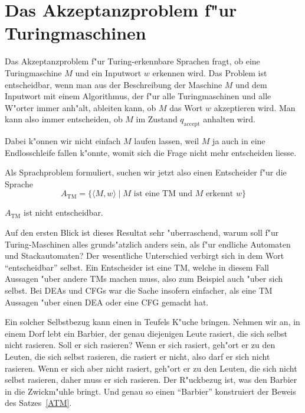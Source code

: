 \section{Das Akzeptanzproblem f"ur Turingmaschinen}
Das Akzeptanzproblem f"ur Turing-erkennbare Sprachen fragt, ob 
eine Turingmaschine $M$ und ein Inputwort $w$ erkennen wird.
Das Problem ist entscheidbar, wenn man aus der Beschreibung
der Maschine $M$ und dem Inputwort mit einem Algorithmus, der
f"ur alle Turingmaschinen und alle W"orter immer anh"alt, ableiten
kann, ob $M$ das Wort $w$ akzeptieren wird. Man kann also immer
entscheiden, ob $M$ im Zustand $q_{\text{accept}}$ anhalten wird.

Dabei k"onnen wir nicht einfach $M$ laufen lassen, weil $M$
ja auch in eine Endlosschleife fallen k"onnte, womit sich die
Frage nicht mehr entscheiden liesse.

Als Sprachproblem formuliert, suchen wir jetzt also einen
Entscheider f"ur die Sprache
\[
A_{\text{TM}}=\{
\langle M,w\rangle\;|\; \text{$M$ ist eine TM und $M$ erkennt $w$}
\}
\]

\begin{satz}
\label{ATM}
$A_{\text{TM}}$ ist nicht entscheidbar.
\end{satz}

Auf den ersten Blick ist dieses Resultat sehr "uberraschend, warum
soll f"ur Turing-Maschinen alles grunds"atzlich anders sein, als
f"ur endliche Automaten und Stackautomaten? Der wesentliche Unterschied
verbirgt sich in dem Wort ``entscheidbar'' selbst. Ein Entscheider ist eine
TM, welche in diesem Fall Aussagen "uber andere TMs machen muss, also
zum Beispiel auch "uber sich selbst. Bei DEAs und CFGs war die Sache
insofern einfacher, als eine TM Aussagen "uber einen DEA oder eine
CFG gemacht hat.

Ein solcher Selbstbezug kann einen in Teufels K"uche bringen. 
Nehmen wir an, in einem Dorf lebt ein Barbier, der genau diejenigen
Leute rasiert, die sich selbst nicht rasieren. Soll er sich rasieren?
Wenn er sich rasiert, geh"ort er zu den Leuten, die sich selbst rasieren,
die rasiert er nicht, also darf er sich nicht rasieren. Wenn er sich
aber nicht rasiert, geh"ort er zu den Leuten, die sich nicht selbst
rasieren, daher muss er sich rasieren. Der R"uckbezug ist, was den
Barbier in die Zwickm"uhle bringt. Und genau so einen ``Barbier''
konstruiert der Beweis des Satzes~\ref{ATM}.

